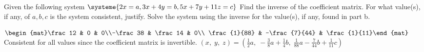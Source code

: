 


\begin{Exercise}[
name={},
title={}, 
difficulty=0,
origin={\cite{YL}}]
Given the following system
$\systeme{2x=a,3x+4y=b,5x+7y+11z=c}$
\Question Find the inverse of the coefficient matrix.
\Question For what value(s), if any, of $a, b, c$ is the system consistent, justify.
\Question Solve the system using the inverse for the value(s), if any, found in part b.
\end{Exercise}
\begin{Answer}
\Question $\begin{mat}\frac12 & 0 & 0\\-\frac38 & \frac14 & 0\\ \frac{1}{88} & -\frac{7}{44} & \frac{1}{11}\end{mat}$
\Question Consistent for all values since the coefficient matrix is invertible.
\Question $(x,\;y,\;z)=\left(\frac12a,\; -\frac38a+\frac14b,\; \frac{1}{88}a-\frac{7}{44}b+\frac{1}{11}c\right)$
\end{Answer}
